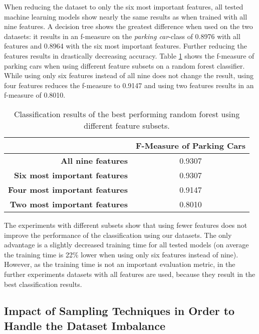 When reducing the dataset to only the six most important features, all tested machine learning models show nearly the same results as when trained with all nine features. A decision tree shows the greatest difference when used on the two datasets: it results in an f-measure on the \emph{parking car}-class of 0.8976 with all features and 0.8964 with the six most important features. Further reducing the features results in drastically decreasing accuracy.
Table \ref{table:result_subsets} shows the f-measure of parking cars when using different feature subsets on a random forest classifier.
While using only six features instead of all nine does not change the result, using four features reduces the f-measure to 0.9147 and using two features results in an f-measure of 0.8010.

\begin{table}


\centering
\bgroup
\def\arraystretch{1.4}
\begin{tabular}{| r || c |}
\hline
	&
   \textbf{F-Measure of Parking Cars} \\
\hline
   \textbf{All nine features}	&
   0.9307  \\
\hline
   \textbf{Six most important features}	&
   0.9307 \\
\hline
   \textbf{Four most important features}	&
   0.9147 \\
\hline
   \textbf{Two most important features}	&
   0.8010 \\
\hline

\end{tabular}
\egroup

\caption{Classification results of the best performing random forest using different feature subsets.}
\label{table:result_subsets}
\end{table}



The experiments with different subsets show that using fewer features does not improve the performance of the classification using our datasets. The only advantage is a slightly decreased training time for all tested models (on average the training time is 22\% lower when using only six features instead of nine). However, as the training time is not an important evaluation metric, in the further experiments datasets with all features are used, because they result in the best classification results.



\subsection{Impact of Sampling Techniques in Order to Handle the Dataset Imbalance}

